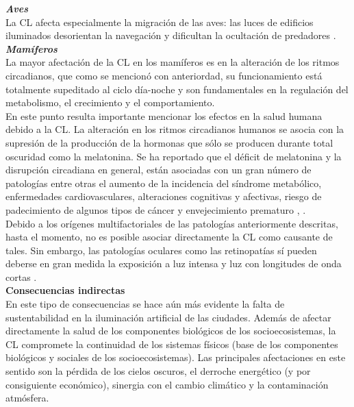 \textit{\textbf{Aves}}\\

La CL afecta especialmente la migración de las aves: las luces de edificios iluminados desorientan la navegación y dificultan la ocultación de predadores \citep{Longcore2006}.\\

\textit{\textbf{Mamíferos}}\\

La mayor afectación de la CL en los mamíferos es en la alteración de los ritmos circadianos, que como se mencionó con anteriordad, su funcionamiento está totalmente supeditado al ciclo día-noche y son fundamentales en la regulación del metabolismo, el crecimiento y el comportamiento.\\

En este punto resulta importante mencionar los efectos en la salud humana debido a la CL. La alteración en los ritmos circadianos humanos se asocia con la supresión de la producción de la hormonas que sólo se producen durante total oscuridad como la melatonina. Se ha reportado que el déficit de melatonina y la disrupción circadiana en general, están asociadas con un gran número de patologías entre otras el aumento de la incidencia del síndrome metabólico, enfermedades cardiovasculares, alteraciones cognitivas y afectivas, riesgo de padecimiento de algunos tipos de cáncer y envejecimiento prematuro \citep{CEI2017}, \citep{LibroCL}.\\

Debido a los orígenes multifactoriales de las patologías anteriormente descritas, hasta el momento, no es posible asociar directamente la CL como causante de tales. Sin embargo, las patologías oculares como las retinopatías sí pueden deberse en gran medida la exposición a luz intensa y luz con longitudes de onda cortas \citep{CEI2017}.\\


\textbf{Consecuencias indirectas}\\ 

En este tipo de consecuencias se hace aún más evidente la falta de sustentabilidad en la iluminación artificial de las ciudades. Además de afectar directamente la salud de los componentes biológicos de los socioecosistemas, la CL compromete la continuidad de los sistemas físicos (base de los componentes biológicos y sociales de los socioecosistemas). Las principales afectaciones en este sentido son la pérdida de los cielos oscuros, el derroche energético (y por consiguiente económico), sinergia con el cambio climático y la contaminación atmósfera.\\ 


